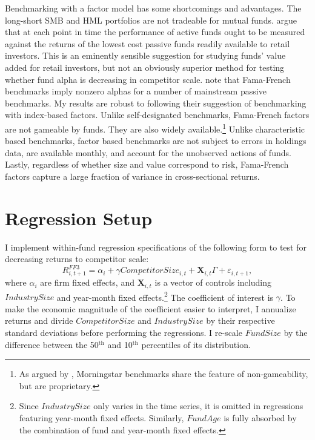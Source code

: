 \documentclass[]{book}
\let\rmarkdownfootnote\footnote%
\def\footnote{\protect\rmarkdownfootnote}
\theoremstyle{definition}
\theoremstyle{definition}
\theoremstyle{definition}
\theoremstyle{remark}
\begin{document}
Benchmarking with a factor model has some shortcomings and advantages.
The long-short SMB and HML portfolios are not tradeable for mutual
funds. \citet{bvb15} argue that at each point in time the performance of
active funds ought to be measured against the returns of the lowest cost
passive funds readily available to retail investors. This is an
eminently sensible suggestion for studying funds' value added for retail
investors, but not an obviously superior method for testing whether fund
alpha is decreasing in competitor scale. \citet{cpz12} note that
Fama-French benchmarks imply nonzero alphas for a number of mainstream
passive benchmarks. My results are robust to following their suggestion
of benchmarking with index-based factors. Unlike self-designated
benchmarks, Fama-French factors are not gameable by funds. They are also
widely available.\footnote{As argued by \citet{pst15}, Morningstar
  benchmarks share the feature of non-gameability, but are proprietary.}
Unlike characteristic based benchmarks, factor based benchmarks are not
subject to errors in holdings data, are available monthly, and account
for the unobserved actions of funds. Lastly, regardless of whether size
and value correspond to risk, Fama-French factors capture a large
fraction of variance in cross-sectional returns.

\hypertarget{regression-setup}{%
\section{Regression Setup}\label{regression-setup}}

I implement within-fund regression specifications of the following form
to test for decreasing returns to competitor scale: \begin{equation}
R^{FF3}_{i,t+1} = \alpha_i + \gamma CompetitorSize_{i,t} + \mathbf{X}_{i,t}\Gamma + \varepsilon_{i,t+1},
\label{eq:regSpec}
\end{equation} where \(\alpha_i\) are firm fixed effects, and
\(\mathbf{X}_{i,t}\) is a vector of controls including \(IndustrySize\)
and year-month fixed effects.\footnote{Since \(IndustrySize\) only
  varies in the time series, it is omitted in regressions featuring
  year-month fixed effects. Similarly, \(FundAge\) is fully absorbed by
  the combination of fund and year-month fixed effects.} The coefficient
of interest is \(\gamma\). To make the economic magnitude of the
coefficient easier to interpret, I annualize returns and divide
\(CompetitorSize\) and \(IndustrySize\) by their respective standard
deviations before performing the regressions. I re-scale \(FundSize\) by
the difference between the 50\(^\text{th}\) and 10\(^\text{th}\)
percentiles of its distribution.
\end{document}
